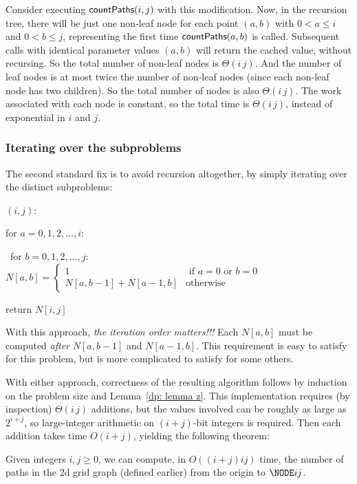 \smallskip 

Consider executing $\textsf{countPaths}(i, j)$ with this modification.
Now, in the recursion tree, there will be just one non-leaf node
for each point $(a,b)$ with $0 < a \le i$ and $0 < b\le j$,
representing the first time $\textsf{countPaths}(a, b)$ is called.
Subsequent calls with identical parameter values $(a,b)$ will return the cached value, without recursing.
So the total number of non-leaf nodes is $\Theta(i\,j)$.
And the number of leaf nodes is at most twice the number of non-leaf nodes
(since each non-leaf node has two children).
So the total number of nodes is also $\Theta(i\,j)$.
The work associated with each node is constant,
so the total time is $\Theta(i\,j)$, instead of exponential in $i$ and $j$.

\subsubsection{Iterating over the subproblems}
The second standard fix is to avoid recursion altogether, by simply iterating over the distinct subproblems:

\smallskip 

\begin{myframed}
  \begin{steps}
  \item[]\countPaths$(i, j)$:
    
    \step for $a=0,1,2,\ldots,i$: 
    \begin{block}
      \step~for $b=0,1,2,\ldots,j$: 
      \step~~~~~ \(N[a, b] = \begin{cases}
          1 & \text{ if } a = 0 \text{ or } b = 0
          \\
          N[a, b-1] + N[a-1, b] & \text{otherwise}
      \end{cases}\)
    \end{block}
    \step return $N[i, j]$
  \end{steps}
\end{myframed}

\smallskip 

With this approach, \emph{the iteration order matters!!!}
Each $N[a,b]$ must be computed \emph{after} $N[a,b-1]$ and $N[a-1, b]$.
This requirement is easy to satisfy for this problem,
but is more complicated to satisfy for some others.

With either approach, correctness of the resulting algorithm follows
by induction on the problem size and Lemma~\ref{dp: lemma z}.
This implementation requires (by inspection)  $\Theta(i\,j)$ additions,
but the values involved can be roughly as large as $2^{i+j}$,
so large-integer arithmetic on $(i+j)$-bit integers is required.
Then each addition takes time $O(i+j)$,
yielding the following theorem:
\begin{theorem}
  Given integers $i, j\ge 0$,
  we can compute, in $O((i+j)ij)$ time,
  the number of paths in the 2d grid graph (defined earlier)
  from the origin to $\NODE i j$.
\end{theorem}

